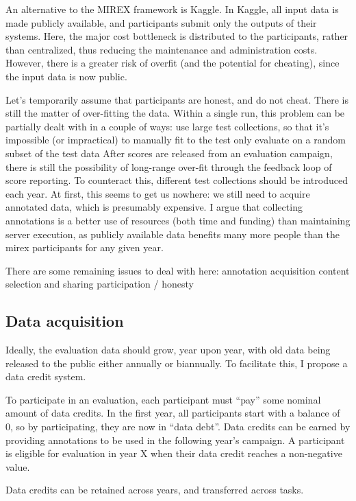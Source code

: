 \documentclass{article}
\begin{document}
An alternative to the MIREX framework is Kaggle.  In Kaggle, all input data is made publicly available, and participants submit only the outputs of their systems.  Here, the major cost bottleneck is distributed to the participants, rather than centralized, thus reducing the maintenance and administration costs.  However, there is a greater risk of overfit (and the potential for cheating), since the input data is now public.

Let’s temporarily assume that participants are honest, and do not cheat.  There is still the matter of over-fitting the data.  Within a single run, this problem can be partially dealt with in a couple of ways:
use large test collections, so that it’s impossible (or impractical) to manually fit to the test
only evaluate on a random subset of the test data
After scores are released from an evaluation campaign, there is still the possibility of long-range over-fit through the feedback loop of score reporting.  To counteract this, different test collections should be introduced each year.  At first, this seems to get us nowhere: we still need to acquire annotated data, which is presumably expensive.  I argue that collecting annotations is a better use of resources (both time and funding) than maintaining server execution, as publicly available data benefits many more people than the mirex participants for any given year.

There are some remaining issues to deal with here:
annotation acquisition
content selection and sharing
participation / honesty

\subsection{Data acquisition}

Ideally, the evaluation data should grow, year upon year, with old data being released to the public either annually or biannually.  To facilitate this, I propose a data credit system.

To participate in an evaluation, each participant must “pay” some nominal amount of data credits.  In the first year, all participants start with a balance of 0, so by participating, they are now in “data debt”.  Data credits can be earned by providing annotations to be used in the following year’s campaign.  A participant is eligible for evaluation in year X when their data credit reaches a non-negative value.

Data credits can be retained across years, and transferred across tasks.
\end{document}

